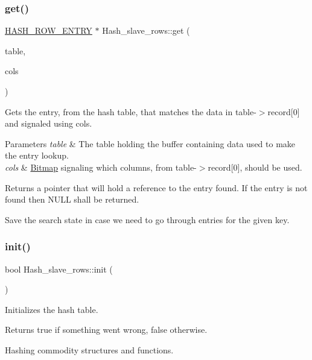 \subsubsection{\texorpdfstring{get()}{get()}}
{\footnotesize\ttfamily \mbox{\hyperlink{structhash__row__entry__st}{H\+A\+S\+H\+\_\+\+R\+O\+W\+\_\+\+E\+N\+T\+RY}} $\ast$ Hash\+\_\+slave\+\_\+rows\+::get (\begin{DoxyParamCaption}\item[{\mbox{\hyperlink{structTABLE}{T\+A\+B\+LE}} $\ast$}]{table,  }\item[{M\+Y\+\_\+\+B\+I\+T\+M\+AP $\ast$}]{cols }\end{DoxyParamCaption})}

Gets the entry, from the hash table, that matches the data in table-\/$>$record\mbox{[}0\mbox{]} and signaled using cols.


\begin{DoxyParams}{Parameters}
{\em table} & The table holding the buffer containing data used to make the entry lookup. \\
\hline
{\em cols} & \mbox{\hyperlink{classBitmap}{Bitmap}} signaling which columns, from table-\/$>$record\mbox{[}0\mbox{]}, should be used.\\
\hline
\end{DoxyParams}
\begin{DoxyReturn}{Returns}
a pointer that will hold a reference to the entry found. If the entry is not found then N\+U\+LL shall be returned. 
\end{DoxyReturn}
Save the search state in case we need to go through entries for the given key.\mbox{\label{classHash__slave__rows_aa18a23b2801ebbcad9c0acac264a9205}} 
\subsubsection{\texorpdfstring{init()}{init()}}
{\footnotesize\ttfamily bool Hash\+\_\+slave\+\_\+rows\+::init (\begin{DoxyParamCaption}\item[{void}]{ }\end{DoxyParamCaption})}

Initializes the hash table.

\begin{DoxyReturn}{Returns}
true if something went wrong, false otherwise.
\end{DoxyReturn}
Hashing commodity structures and functions. \mbox{\label{classHash__slave__rows_adf1fd971e92cb1fa456daafdf46b172e}} 
